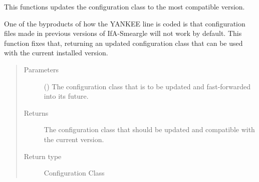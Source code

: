 \documentclass[letterpaper,10pt,english]{sphinxmanual}
\begin{document}

\begin{fulllineitems}
\label{\detokenize{python_docstrings/IfA_Smeargle.yankee.yankee_functions:IfA_Smeargle.yankee.yankee_functions.fast_forward_configuration_class}}
This functions updates the configuration class to the most compatible
version.

One of the byproducts of how the YANKEE line is coded is that
configuration files made in previous versions of IfA-Smeargle will not
work by default. This function fixes that, returning an updated
configuration class that can be used with the current installed version.
\begin{quote}\begin{description}
\item[{Parameters}] \leavevmode
{} () \textendash{} The configuration class that is to be updated and fast-forwarded into
its future.

\item[{Returns}] \leavevmode
{} \textendash{} The configuration class that should be updated and compatible with
the current version.

\item[{Return type}] \leavevmode
Configuration Class

\end{description}\end{quote}

\end{fulllineitems}

\end{document}
